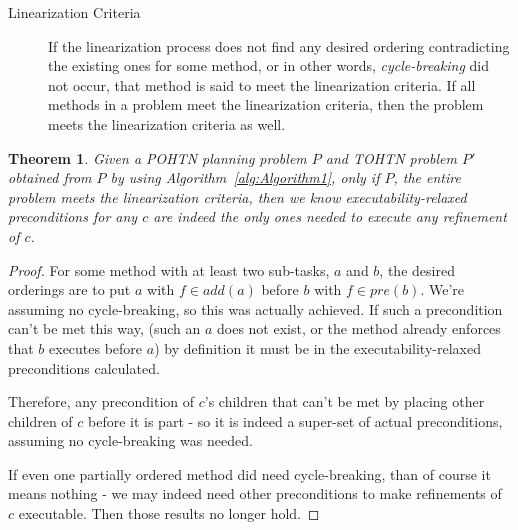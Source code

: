 \documentclass[letterpaper]{article} %
\newtheorem{theorem}{Theorem}
\newcommand{\Pre} {\ensuremath{\mathit{pre}}}  %
\newcommand{\Add} {\ensuremath{\mathit{add}}}
\begin{document}


\begin{description}
	\item[Linearization Criteria] If the linearization process does not find any desired ordering contradicting the existing ones for some method, or in other words, \emph{cycle-breaking} did not occur, that method is said to meet the linearization criteria. If all methods in a problem meet the linearization criteria, then the problem meets the linearization criteria as well. 
\end{description}




\begin{theorem} \label{thm:RelaxedPreconditions}
	Given a POHTN planning problem $P$ and TOHTN problem $P'$ obtained from $P$ by using Algorithm~\ref{alg:Algorithm1}, \emph{only if $P$, the entire problem meets the linearization criteria},
	then we know executability-relaxed preconditions for any $c$ are indeed the only ones needed to execute any refinement of $c$.
\end{theorem}
\begin{proof}
	
	For some method with at least two sub-tasks, $a$ and $b$,
	the desired orderings are to put $a$ with $f \in \Add(a)$ before $b$ with $f \in \Pre(b)$. We're assuming no cycle-breaking, so this was actually achieved. If such a precondition can't be met this way, (such an $a$ does not exist, or the method already enforces that $b$ executes before $a$) by definition it must be in the executability-relaxed preconditions calculated. 

	Therefore, any precondition of $c$'s children that can't be met by placing other children of $c$ before it is part - so it is indeed a super-set of actual preconditions, assuming no cycle-breaking was needed.
	
	If even one partially ordered method did need cycle-breaking, than of course it means nothing - we may indeed need other preconditions to make refinements of $c$ executable. Then those results no longer hold.
\end{proof}
\end{document}
